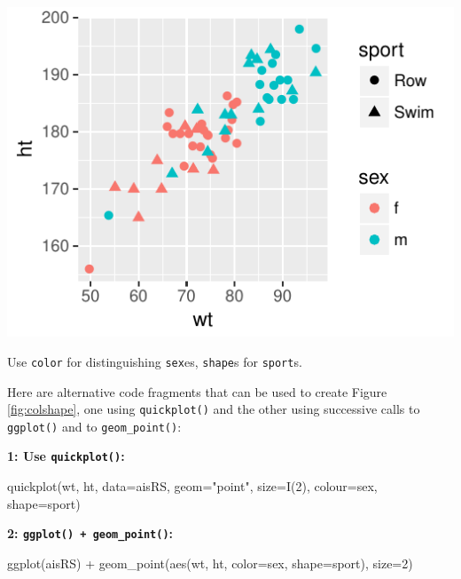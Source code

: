 \documentclass{tufte-book}\usepackage[]{graphicx}\usepackage[]{color}
\newcommand{\txtt}[1]{\texttt{#1}}
\begin{document}
\begin{marginfigure}[-72pt]
\begin{Schunk}


\centerline{\includegraphics[width=\textwidth]{figs/07-quick-rs1-1} }

\end{Schunk}
\caption{Use \texttt{color} for distinguishing \texttt{sex}es,
\texttt{shape}s for \texttt{sport}s.}\label{fig:colshape}

\end{marginfigure}

Here are alternative code fragments that can be used to create
Figure \ref{fig:colshape}, one using \txtt{quickplot()} and the other
using successive calls to \txtt{ggplot()} and to \txtt{geom\_point()}:
\vspace*{9pt}

\begin{fullwidth}
\begin{minipage}[t]{0.36\linewidth}
{\bf 1: Use \txtt{quickplot()}:}
\begin{Schunk}
\begin{Sinput}
quickplot(wt, ht,
          data=aisRS,
          geom="point",
          size=I(2),
          colour=sex,
          shape=sport)
\end{Sinput}
\end{Schunk}
\end{minipage}
\hspace*{0.04\textwidth}
\begin{minipage}[t]{0.4\linewidth}
{\bf 2: \txtt{ggplot() + geom\_point()}:}
\begin{Schunk}
\begin{Sinput}
ggplot(aisRS) +
  geom_point(aes(wt, ht,
               color=sex,
               shape=sport),
             size=2)
\end{Sinput}
\end{Schunk}
\end{minipage}
\end{fullwidth}
\end{document}
